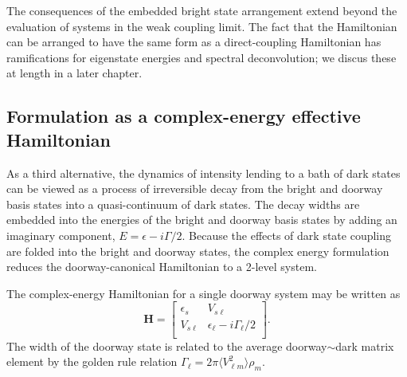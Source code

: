 The consequences of the embedded bright state arrangement extend
beyond the evaluation of systems in the weak coupling limit.  The fact
that the Hamiltonian can be arranged to have the same form as a
direct-coupling Hamiltonian has ramifications for eigenstate energies
and spectral deconvolution; we discus these at length in a later
chapter.

\subsection{Formulation as a complex-energy effective
  Hamiltonian}
\label{sec:complex-energy}

As a third alternative, the dynamics of intensity lending to a bath of
dark states can be viewed as a process of irreversible decay from the
bright and doorway basis states into a quasi-continuum of dark
states. The decay widths are embedded into the energies of the bright
and doorway basis states by adding an imaginary component, $E =
\epsilon -i \Gamma / 2$. Because the effects of dark state coupling
are folded into the bright and doorway states, the complex energy
formulation reduces the doorway-canonical Hamiltonian to a 2-level
system.

The complex-energy Hamiltonian for a single doorway system may be
written as
\begin{equation}
  \label{eq:complex-h}
  \mathbf{H} = 
  \begin{bmatrix}
    \epsilon_s & V_{s\ell} \\
    V_{s\ell} & \epsilon_{\ell} - i \Gamma_{\ell} / 2 \\
  \end{bmatrix}.
\end{equation}
The width of the doorway state is related to the average doorway$\sim$dark
matrix element by the golden rule relation $\Gamma_{\ell} = 2 \pi \langle
V_{\ell m}^2 \rangle \rho_{m}$.

